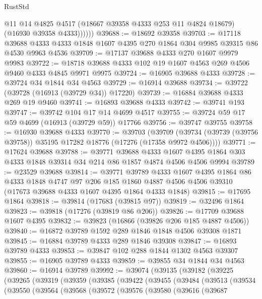 \begin{lexlean}{RustStd}
\begin{coremodule}
              @11
              @14
              @4825
              @4517
              (@18667 @39358 @4333 @253 @11 @4824 @18679)
              (@16930 @39358 @4333))))))
@39688 := @18692 @39358
@39703 := @17118
    @39688
    @4333
    @4333
    @1848
    @1607
    @4395
    @270
    @1864
    @304
    @9985
    @39315
    @86
    @4530
    @9963
    @4536
@39709 := @17137 @39688 @4333 @270 @1607 @9979 @9983
@39722 := @18718 @39688 @4333 @102 @19 @1607 @4563 @269 @4506 @9460 @4333 @4845 @9971 @9975
@39724 := @16905 @39688 @4333
@39728 := @39724 @34 @1844 @34 @4563
@39729 := @16914 @39688
@39734 := @39722 (@39728 (@16913 (@39729 @34)) @17220)
@39739 := @16884 @39688 @4333 @269 @19 @9460
@39741 := @16893 @39688 @4333
@39742 := @39741 @193
@39747 := @39742 @104 @17 @14 @4699 @4517
@39755 := @39724 @59 @17 @59 @4699 (@16913 (@39729 @59)) @17766
@39756 := @39747 @39755
@39758 := @16930 @39688 @4333
@39770 := @39703
    (@39709 (@39734 (@39739 (@39756 @39758)) @35195 @17282 @18776 (@17276 (@17358 @9972 @4506))))
@39771 := @17624 @39688
@39788 := @39771
    @39688
    @4333
    @1607
    @4395
    @1864
    @303
    @4333
    @1848
    @39314
    @34
    @214
    @86
    @1857
    @4874
    @4506
    @4506
    @9994
@39789 := @23529 @39688
@39814 := @39771
    @39789
    @4333
    @1607
    @4395
    @1864
    @86
    @4333
    @1848
    @4747
    @97
    @206
    @185
    @1860
    @4887
    @4506
    @4506
    @39310
    (@17673 @39688 @4333 @1607 @4395 @1864 @4333 @1848)
@39815 := @17695 @1864
@39818 := @39814 (@17683 (@39815 @97))
@39819 := @32496 @1864
@39823 := @39818 (@17276 (@39819 @86 @206))
@39826 := @17709 @39688 @1607 @4395
@39832 := @39823 (@16866 (@39826 @206 @185 @4887 @4506))
@39840 := @16872 @39789 @1592 @289 @1846 @1848 @4506 @39308 @1871
@39845 := @16884 @39789 @4333 @289 @1846 @39308
@39847 := @16893 @39789 @4333
@39853 := @39847 @102 @288 @1844 @1302 @4563 @39307
@39855 := @16905 @39789 @4333
@39859 := @39855 @34 @1844 @34 @4563
@39860 := @16914 @39789
@39992 := @39074
    (@39135
      (@39182
        (@39225
          (@39265
            (@39319
              (@39359
                (@39385
                  (@39422
                    (@39455
                      (@39484
                        (@39513
                          (@39534
                            (@39550
                              (@39564
                                (@39568
                                  (@39572
                                    (@39576
                                      (@39580
                                        (@39616
                                          (@39687

\end{coremodule}
\end{lexlean}
